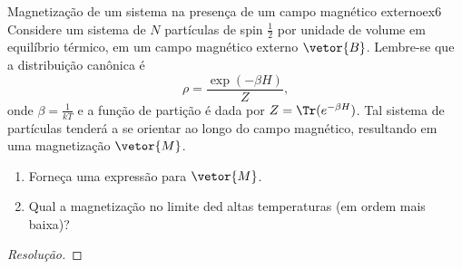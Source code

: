 \begin{exercício}{Magnetização de um sistema na presença de um campo magnético externo}{ex6}
   Considere um sistema de \(N\) partículas de spin \(\frac12\) por unidade de volume em equilíbrio térmico, em um campo magnético externo \(\vetor{B}\). Lembre-se que a distribuição canônica é
   \begin{equation*}
      \rho = \frac{\exp(- \beta H)}{Z},
   \end{equation*}
   onde \(\beta = \frac{1}{k T}\) e a função de partição é dada por \(Z = \Tr(e^{-\beta H})\). Tal sistema de partículas tenderá a se orientar ao longo do campo magnético, resultando em uma magnetização \(\vetor{M}\).
   \begin{enumerate}[label=(\alph*)]
      \item Forneça uma expressão para \(\vetor{M}\).
      \item Qual a magnetização no limite ded altas temperaturas (em ordem mais baixa)?
   \end{enumerate}
\end{exercício}
\begin{proof}[Resolução]
    
\end{proof}
